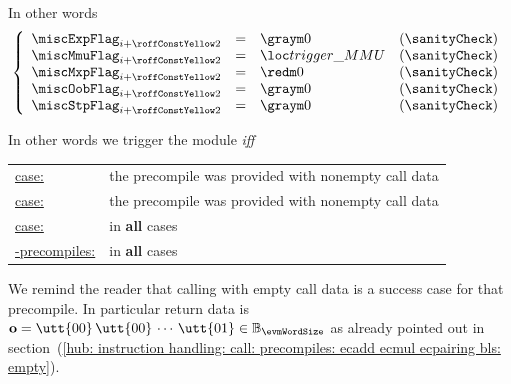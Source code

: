 \begin{description}
\begin{description}
				In other words
				\[
					\left\{ \begin{array}{lclr}
						\miscExpFlag _{i + \prcStandardSuccessSecondMiscRowOffset} & = & \gZero         & (\sanityCheck) \\
						\miscMmuFlag _{i + \prcStandardSuccessSecondMiscRowOffset} & = & \locTriggerMmu & (\sanityCheck) \\
						\miscMxpFlag _{i + \prcStandardSuccessSecondMiscRowOffset} & = & \rZero         & (\sanityCheck) \\
						\miscOobFlag _{i + \prcStandardSuccessSecondMiscRowOffset} & = & \gZero         & (\sanityCheck) \\
						\miscStpFlag _{i + \prcStandardSuccessSecondMiscRowOffset} & = & \gZero         & (\sanityCheck) \\
					\end{array} \right.
				\]
		\end{description}
\end{description}
\saNote{} In other words we trigger the \mmuMod{} module \emph{iff}
\begin{center}
	\renewcommand{\arraystretch}{1.5}
	\begin{tabular}{|ll|}
		\hline
		\underline{\instEcadd{}     case:}     & the precompile was provided with nonempty call data          \\
		\underline{\instEcmul{}     case:}     & the precompile was provided with nonempty call data          \\
		\underline{\instEcpairing{} case:}     & in \textbf{all} cases                                        \\
		\underline{\blsDataMod{}-precompiles:} & in \textbf{all} cases                                        \\
	\end{tabular}
\end{center}
We remind the reader that calling \instEcpairing{} with empty call data is a success case for that precompile.
In particular return data is
$\textbf{o} = \utt{00}\, \utt{00}\, \cdots \, \utt{01} \in \mathbb{B}_{\evmWordSize}$
as already pointed out in
section~(\ref{hub: instruction handling: call: precompiles: ecadd ecmul ecpairing bls: empty}).
